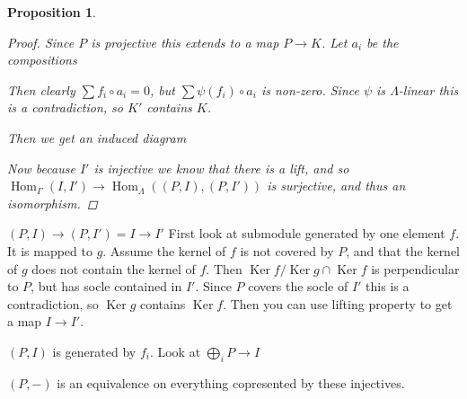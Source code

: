 \documentclass[11pt, a4paper, english]{article}
\newtheorem{prop}[theorem]{Proposition}
\theoremstyle{definition}
\DeclareMathOperator{\Hom}{Hom}
\DeclareMathOperator{\Ker}{Ker}
\begin{document}
\begin{prop}
\begin{proof}
		Since $P$ is projective this extends to a map $P \to K$. Let $a_i$ be the compositions 
		Then clearly $\sum f_i \circ a_i = 0$, but $\sum \psi(f_i) \circ a_i$ is non-zero. Since $\psi$ is $\Lambda$-linear this is a contradiction, so $K'$ contains $K$.
		
		Then we get an induced diagram
		\begin{center}
		\end{center}
		Now because $I'$ is injective we know that there is a lift, and so $\Hom_\Gamma(I, I') \to \Hom_\Lambda((P,I), (P, I'))$ is surjective, and thus an isomorphism.
	\end{proof} 
\end{prop}

$(P, I) \to (P, I') = I \to I'$
First look at submodule generated by one element $f$. It is mapped to $g$. Assume the kernel of $f$ is not covered by $P$, and that the kernel of $g$ does not contain the kernel of $f$. Then $\Ker f / \Ker g \cap \Ker f$ is perpendicular to $P$, but has socle contained in $I'$. Since $P$ covers the socle of $I'$ this is a contradiction, so $\Ker g$ contains $\Ker f$. Then you can use lifting property to get a map $I \to I'$. 

$(P,I)$ is generated by $f_i$. Look at $\bigoplus_i P \to I$

$(P,-)$ is an equivalence on everything copresented by these injectives.
\end{document}
